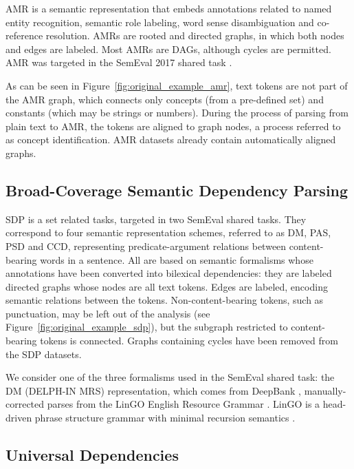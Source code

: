 \documentclass[11pt,a4paper]{article}
\begin{document}
AMR \cite{banarescu2013abstract}
is a semantic representation that embeds annotations related
to named entity recognition, semantic role labeling, word
sense disambiguation and co-reference resolution.
AMRs are rooted and directed graphs, in which both nodes and edges are labeled.
Most AMRs are DAGs, although cycles are permitted.
AMR was targeted in the SemEval 2017 shared task \cite{may2017semeval}.

As can be seen in Figure~\ref{fig:original_example_amr}, text tokens are not part
of the AMR graph, which connects only concepts (from a pre-defined set)
and constants (which may be strings or numbers).
During the process of parsing from plain text to AMR,
the tokens are aligned to graph nodes,
a process referred to as concept identification.
AMR datasets already contain automatically aligned graphs.

\subsection{Broad-Coverage Semantic Dependency Parsing}\label{sec:sdp}

SDP \cite{oepen2014semeval,oepen2015semeval,oepen2016towards}
is a set related tasks, targeted in two SemEval shared tasks.
They correspond to four semantic representation schemes, referred to as
DM, PAS, PSD and CCD, representing
predicate-argument relations between content-bearing words in a sentence.
All are based on semantic formalisms whose annotations have been
converted into bilexical dependencies:
they are labeled directed graphs whose nodes are all text tokens.
Edges are labeled, encoding semantic relations between the tokens.
Non-content-bearing tokens, such as punctuation,
may be left out of the analysis (see Figure~\ref{fig:original_example_sdp}),
but the subgraph restricted to content-bearing tokens is connected.
Graphs containing cycles have been removed from the SDP datasets.

We consider one of the three formalisms used in the SemEval shared task:
the DM (DELPH-IN MRS) representation, which comes
from DeepBank \cite{flickinger2012deepbank},
manually-corrected parses from the LinGO
English Resource Grammar \cite{copestake2000open}.
LinGO is a head-driven phrase
structure grammar \cite[HPSG; ][]{pollard1994head}
with minimal recursion semantics \cite{copestake2005minimal}.

\subsection{Universal Dependencies}\label{sec:ud}
\end{document}

